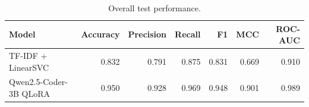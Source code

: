 \begin{table}[H]
\centering
\begin{tabular}{lrrrrrr}
\toprule
Model & Accuracy & Precision & Recall & F1 & MCC & ROC-AUC \\
\midrule
TF-IDF + LinearSVC & 0.832 & 0.791 & 0.875 & 0.831 & 0.669 & 0.910 \\
Qwen2.5-Coder-3B QLoRA & 0.950 & 0.928 & 0.969 & 0.948 & 0.901 & 0.989 \\
\bottomrule
\end{tabular}
\caption{Overall test performance.}
\label{tab:overall-metrics}
\end{table}
